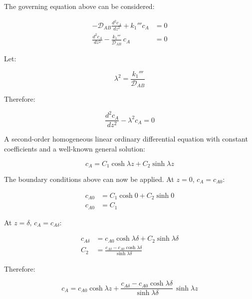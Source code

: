 \documentclass[letterpaper,12pt]{article}
\begin{document}
The governing equation above can be considered:

\begin{equation}
\begin{aligned}
    -\mathcal{D}_{AB}\frac{d^2 c_A}{dz^2} + k_1''' c_A           &= 0 \\
    \frac{d^2 c_A}{dz^2} - \frac{k_1'''}{\mathcal{D}_{AB}}\, c_A &= 0
\end{aligned}
\end{equation}

Let:

\begin{equation}
    \lambda^2 = \frac{k_1'''}{\mathcal{D}_{AB}}
\end{equation}

Therefore:

\begin{equation}
    \frac{d^2 c_A}{dz^2} - \lambda^2 c_A = 0
\end{equation}

A second-order homogeneous linear ordinary differential equation with constant coefficients and a well-known general solution:

\begin{equation}
    c_A = C_1\cosh\lambda z + C_2\sinh\lambda z
\end{equation}

The boundary conditions above can now be applied. At $z = 0$, $c_A = c_{A0}$:

\begin{equation}
\begin{aligned}
    c_{A0} &= C_1\cosh 0 + C_2\sinh 0 \\
    c_{A0} &= C_1
\end{aligned}
\end{equation}

At $z = \delta$, $c_A = c_{A \delta}$:

\begin{equation}
\begin{aligned}
    c_{A\delta} &= c_{A0}\cosh\lambda\delta + C_2\sinh\lambda\delta \\
    C_2         &= \frac{c_{A\delta} - c_{A0}\cosh\lambda\delta}{\sinh\lambda\delta}
\end{aligned}
\end{equation}

Therefore:

\begin{equation}
    c_A = c_{A0}\cosh\lambda z + \frac{c_{A\delta} - c_{A0}\cosh\lambda\delta}{\sinh\lambda\delta}\,\sinh\lambda z
\end{equation}
\end{document}
